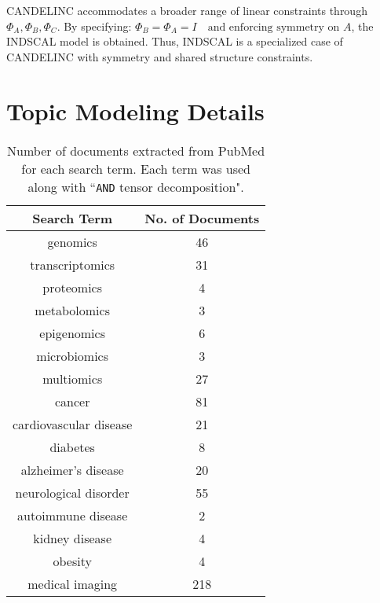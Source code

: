 CANDELINC accommodates a broader range of linear constraints through $\Phi_A, \Phi_B, \Phi_C$. By specifying: $\Phi_B = \Phi_A = I \quad \text{and enforcing symmetry on } A$,
the INDSCAL model is obtained. Thus, INDSCAL is a specialized case of CANDELINC with symmetry and shared structure constraints.






\section{Topic Modeling Details}

\setcounter{table}{1}
\begin{table}[h!]
\centering
 \begin{tabular}{||c | c||} 
 \hline
 \textbf{Search Term} & \textbf{No. of Documents} \\ 
 \hline\hline
genomics & 46 \\ 
 \hline
transcriptomics & 31 \\ 
 \hline
proteomics & 4 \\ 
 \hline
metabolomics & 3 \\ 
 \hline
epigenomics & 6 \\ 
 \hline
microbiomics & 3 \\ 
 \hline
multiomics & 27 \\ 
 \hline
cancer & 81 \\ 
 \hline
cardiovascular disease & 21 \\ 
 \hline
diabetes & 8 \\ 
 \hline
alzheimer's disease & 20 \\ 
 \hline
neurological disorder & 55 \\ 
 \hline
autoimmune disease & 2 \\ 
 \hline
kidney disease & 4 \\ 
 \hline
obesity & 4 \\ 
 \hline
medical imaging & 218 \\ 
 \hline
 \end{tabular}
 \caption{Number of documents extracted from PubMed for each search term. Each term was used along with ``\texttt{AND} tensor decomposition".}
\end{table}

